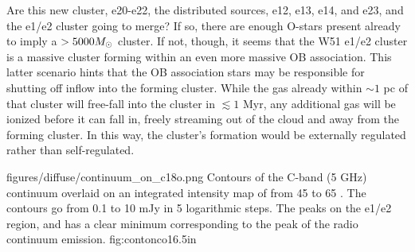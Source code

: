 Are this new cluster, e20-e22, the distributed sources, e12, e13, e14, and e23,
and the e1/e2 cluster going to merge?  If so, there are enough O-stars present
already to imply a $>5000 M_{\odot}$ cluster.  If not, though, it seems that the
W51 e1/e2 cluster is a massive cluster forming within an even more massive OB
association.  This latter scenario hints that the OB association stars may be
responsible for shutting off inflow into the forming cluster.  While the gas
already within $\sim 1$ pc of that cluster will free-fall into the cluster in
$\lesssim 1$ Myr, any additional gas will be ionized before it can fall in,
freely streaming out of the cloud and away from the forming cluster.  In this
way, the cluster's formation would be externally regulated rather than
self-regulated.


\Figure
{figures/diffuse/continuum_on_c18o.png}
{Contours of the C-band (5 GHz) continuum overlaid on an integrated intensity
map of \ceighteeno from 45 to 65 \kms \citep{Parsons2012a}.  The contours
go from 0.1 to 10 mJy in 5 logarithmic steps.  The \ceighteeno peaks on the
e1/e2 region, and has a clear minimum corresponding to the peak of the radio
continuum emission.
}
{fig:contonco}{1}{6.5in}


%
%
%


